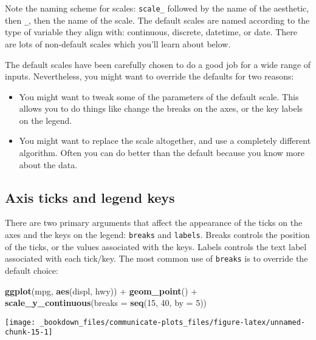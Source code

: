 \documentclass[]{book}
\newenvironment{Shaded}{\begin{snugshade}}{\end{snugshade}}
\newcommand{\KeywordTok}[1]{\textcolor[rgb]{0.13,0.29,0.53}{\textbf{{#1}}}}
\newcommand{\DataTypeTok}[1]{\textcolor[rgb]{0.13,0.29,0.53}{{#1}}}
\newcommand{\DecValTok}[1]{\textcolor[rgb]{0.00,0.00,0.81}{{#1}}}
\newcommand{\StringTok}[1]{\textcolor[rgb]{0.31,0.60,0.02}{{#1}}}
\newcommand{\NormalTok}[1]{{#1}}
\begin{document}
Note the naming scheme for scales: \texttt{scale\_} followed by the name
of the aesthetic, then \texttt{\_}, then the name of the scale. The
default scales are named according to the type of variable they align
with: continuous, discrete, datetime, or date. There are lots of
non-default scales which you'll learn about below.

The default scales have been carefully chosen to do a good job for a
wide range of inputs. Nevertheless, you might want to override the
defaults for two reasons:

\begin{itemize}
\item
  You might want to tweak some of the parameters of the default scale.
  This allows you to do things like change the breaks on the axes, or
  the key labels on the legend.
\item
  You might want to replace the scale altogether, and use a completely
  different algorithm. Often you can do better than the default because
  you know more about the data.
\end{itemize}

\subsection{Axis ticks and legend
keys}\label{axis-ticks-and-legend-keys}

There are two primary arguments that affect the appearance of the ticks
on the axes and the keys on the legend: \texttt{breaks} and
\texttt{labels}. Breaks controls the position of the ticks, or the
values associated with the keys. Labels controls the text label
associated with each tick/key. The most common use of \texttt{breaks} is
to override the default choice:

\begin{Shaded}
\begin{Highlighting}[]
\KeywordTok{ggplot}\NormalTok{(mpg, }\KeywordTok{aes}\NormalTok{(displ, hwy)) +}
\StringTok{  }\KeywordTok{geom_point}\NormalTok{() +}
\StringTok{  }\KeywordTok{scale_y_continuous}\NormalTok{(}\DataTypeTok{breaks =} \KeywordTok{seq}\NormalTok{(}\DecValTok{15}\NormalTok{, }\DecValTok{40}\NormalTok{, }\DataTypeTok{by =} \DecValTok{5}\NormalTok{))}
\end{Highlighting}
\end{Shaded}

\begin{center}\texttt{[image: \_bookdown\_files/communicate-plots\_files/figure-latex/unnamed-chunk-15-1]} \end{center}
\end{document}
